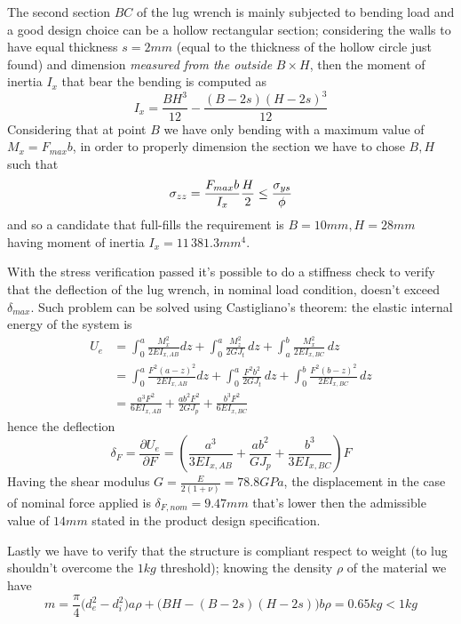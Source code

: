 	The second section $BC$ of the lug wrench is mainly subjected to bending load and a good design choice can be a hollow rectangular section; considering the walls to have equal thickness $s = 2mm$ (equal to the thickness of the hollow circle just found) and dimension \textit{measured from the outside} $B\times H$, then the moment of inertia $I_x$ that bear the bending is computed as
	\[ I_x = \frac{BH^3}{12} - \frac{(B-2s)(H-2s)^3}{12} \]
	Considering that at point $B$ we have only bending with a maximum value of $M_x = F_{max} b$, in order to properly dimension the section we have to chose $B,H$ such that
	\[ \sigma_{zz} = \frac{F_{max} b}{I_x} \frac H 2 \leq \frac {\sigma_{ys}} \phi \]
	and so a candidate that full-fills the requirement is $B = 10mm, H=28mm$ having moment of inertia $I_x = 11\,381.3mm^{4}$.
	
	With the stress verification passed it's possible to do a stiffness check to verify that the deflection of the lug wrench, in nominal load condition, doesn't exceed $\delta_{max}$. Such problem can be solved using Castigliano's theorem: the elastic internal energy of the system is
	\begin{align*}
		U_e & = \int_0^a \frac{M_x^2}{2 E I_{x,AB}} dz + \int_0^a \frac{M_z^2}{2GJ_t}\, dz + \int_a^b \frac{M_x^2}{2 E I_{x,BC}}\, dz \\
		& = \int_0^a \frac{F^2(a-z)^2}{2 E I_{x,AB}} dz + \int_0^a \frac{F^2b^2}{2GJ_t}\, dz + \int_0^b \frac{F^2(b-z)^2}{2 E I_{x,BC}}\, dz \\
		& = \frac{a^3F^2}{6 E I_{x,AB}} + \frac{a b^2 F^2}{2G J_p} + \frac{b^3F^2}{6 E I_{x,BC}}
	\end{align*}
	hence the deflection
	\[ \delta_F = \frac{\partial U_e}{\partial F} = \left( \frac{a^3}{3 E I_{x,AB}} + \frac{a b^2}{G J_p} + \frac{b^3}{3 E I_{x,BC}} \right) F  \]
	Having the shear modulus $G = \frac E{2(1+\nu)} = 78.8 GPa$, the displacement in the case of nominal force applied is $\delta_{F,nom} = 9.47mm$ that's lower then the admissible value of $14 mm$ stated in the product design specification. 
	
	Lastly we have to verify that the structure is compliant respect to weight (to lug shouldn't overcome the $1kg$ threshold); knowing the density $\rho$ of the material we have
	\[ m = \frac \pi 4 \big(d_e^2-d_i^2\big) a \rho + \Big(BH - (B-2s)(H-2s)\Big) b \rho = 0.65 kg < 1kg  \]
	
	
	
	
	
	
	
	
	
	
	
	
	
	
	
	
	
	
	
	
	
	
	